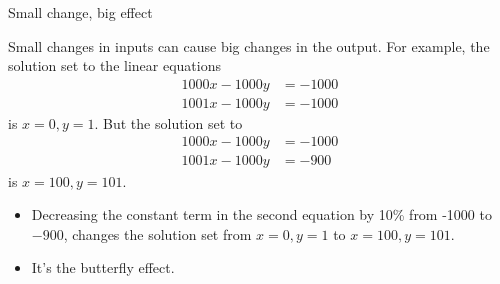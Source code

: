 \documentclass[usenames,dvipsnames,fleqn]{beamer}
\author[BW]{BW}
\theoremstyle{definition}
\begin{document}
\begin{frame}{Small change, big effect}


Small changes in inputs can cause big changes in the output. For example, the 
solution set to the linear equations
\begin{align*}
    1000 x - 1000 y &= -1000\\
   1001 x - 1000 y &= -1000
\end{align*}
is \(x = 0, y = 1 \).  But the solution set to
\begin{align*}
    1000 x - 1000 y &= -1000 \\
   1001 x - 1000 y &= -900
\end{align*}
is \(x=100,y=101\). 


\begin{itemize}

\item  Decreasing the constant term in the second equation by 10\% from -1000 to  \(-900\), changes the solution set from \(x=0,y=1\) to 
 \(x=100,y=101\). 
 
 \item It's the butterfly effect.
\end{itemize}

\end{frame}
\end{document}
